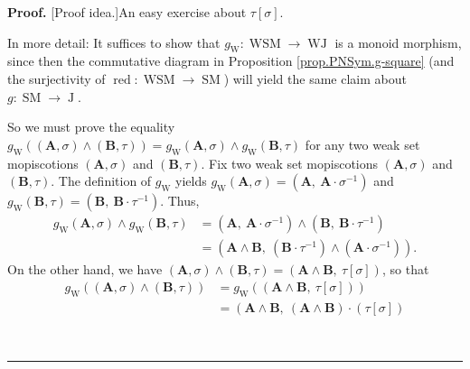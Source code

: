 \documentclass[numbers=enddot,12pt,final,onecolumn,notitlepage]{scrartcl}%
\newcounter{exer}
\theoremstyle{definition}
\newenvironment{fineprint}{\begin{small}}{\end{small}}
\newenvironment{proof}[1][Proof]{\noindent\textbf{#1.} }{\ \rule{0.5em}{0.5em}}
\begin{document}
\begin{proof}
[Proof idea.]An easy exercise about $\tau\left[  \sigma\right]  $.

\begin{fineprint}
In more detail: It suffices to show that $g_{\operatorname*{W}}%
:\operatorname*{WSM}\rightarrow\operatorname*{WJ}$ is a monoid morphism, since
then the commutative diagram in Proposition \ref{prop.PNSym.g-square} (and the
surjectivity of $\operatorname*{red}:\operatorname*{WSM}\rightarrow
\operatorname*{SM}$) will yield the same claim about $g:\operatorname*{SM}%
\rightarrow\operatorname*{J}$.

So we must prove the equality $g_{\operatorname*{W}}\left(  \left(
\mathbf{A},\sigma\right)  \wedge\left(  \mathbf{B},\tau\right)  \right)
=g_{\operatorname*{W}}\left(  \mathbf{A},\sigma\right)  \wedge
g_{\operatorname*{W}}\left(  \mathbf{B},\tau\right)  $ for any two weak set
mopiscotions $\left(  \mathbf{A},\sigma\right)  $ and $\left(  \mathbf{B}%
,\tau\right)  $. Fix two weak set mopiscotions $\left(  \mathbf{A}%
,\sigma\right)  $ and $\left(  \mathbf{B},\tau\right)  $. The definition of
$g_{\operatorname*{W}}$ yields $g_{\operatorname*{W}}\left(  \mathbf{A}%
,\sigma\right)  =\left(  \mathbf{A},\ \mathbf{A}\cdot\sigma^{-1}\right)  $ and
$g_{\operatorname*{W}}\left(  \mathbf{B},\tau\right)  =\left(  \mathbf{B}%
,\ \mathbf{B}\cdot\tau^{-1}\right)  $. Thus,%
\begin{align}
g_{\operatorname*{W}}\left(  \mathbf{A},\sigma\right)  \wedge
g_{\operatorname*{W}}\left(  \mathbf{B},\tau\right)   &  =\left(
\mathbf{A},\ \mathbf{A}\cdot\sigma^{-1}\right)  \wedge\left(  \mathbf{B}%
,\ \mathbf{B}\cdot\tau^{-1}\right) \nonumber\\
&  =\left(  \mathbf{A}\wedge\mathbf{B},\ \left(  \mathbf{B}\cdot\tau
^{-1}\right)  \wedge\left(  \mathbf{A}\cdot\sigma^{-1}\right)  \right)  .
\label{pf.prop.PNSym.g-mon.1}%
\end{align}
On the other hand, we have $\left(  \mathbf{A},\sigma\right)  \wedge\left(
\mathbf{B},\tau\right)  =\left(  \mathbf{A}\wedge\mathbf{B},\ \tau\left[
\sigma\right]  \right)  $, so that%
\begin{align}
g_{\operatorname*{W}}\left(  \left(  \mathbf{A},\sigma\right)  \wedge\left(
\mathbf{B},\tau\right)  \right)   &  =g_{\operatorname*{W}}\left(  \left(
\mathbf{A}\wedge\mathbf{B},\ \tau\left[  \sigma\right]  \right)  \right)
\nonumber\\
&  =\left(  \mathbf{A}\wedge\mathbf{B},\ \left(  \mathbf{A}\wedge
\mathbf{B}\right)  \cdot\left(  \tau\left[  \sigma\right]  \right)

\end{align}
\end{fineprint}
\end{proof}
\end{document}
